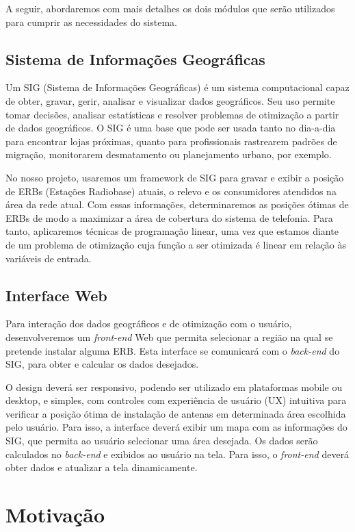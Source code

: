 \documentclass[]{politex}
\begin{document}
A seguir, abordaremos com mais detalhes os dois módulos que serão utilizados
para cumprir as necessidades do sistema.

\subsection{Sistema de Informações Geográficas}

Um SIG (Sistema de Informações Geográficas) é um sistema computacional capaz de
obter, gravar, gerir, analisar e visualizar dados geográficos. Seu uso permite
tomar decisões, analisar estatísticas e resolver problemas de otimização a
partir de dados geográficos. O SIG é uma base que pode ser usada tanto no
dia-a-dia para encontrar lojas próximas, quanto para profissionais rastrearem
padrões de migração, monitorarem desmatamento ou planejamento urbano,
por exemplo.

No nosso projeto, usaremos um framework de SIG para gravar e exibir a posição de
ERBs (Estações Radiobase) atuais, o relevo e os consumidores atendidos na área
da rede atual. Com essas informações, determinaremos as posições ótimas de
ERBs de modo a maximizar a área de cobertura do sistema de telefonia.
Para tanto, aplicaremos técnicas de programação linear, uma vez que
estamos diante de um problema de otimização cuja função a ser otimizada
é linear em relação às variáveis de entrada.

\subsection{Interface Web}

Para interação dos dados geográficos e de otimização com o usuário,
desenvolveremos um \textit{front-end} Web que permita selecionar a região na
qual se pretende instalar alguma ERB. Esta interface se comunicará com o
\textit{back-end} do SIG, para obter e calcular os dados desejados.

O design deverá ser responsivo, podendo ser utilizado em plataformas mobile
ou desktop, e simples, com controles com experiência de usuário (UX) intuitiva
para verificar a posição ótima de instalação de antenas em determinada área
escolhida pelo usuário. Para isso, a interface deverá exibir um mapa com as
informações do SIG, que permita ao usuário selecionar uma área desejada. Os
dados serão calculados no \textit{back-end} e exibidos ao usuário na tela. Para
isso, o \textit{front-end} deverá obter dados e atualizar a tela dinamicamente.

\section{Motivação}
\end{document}
